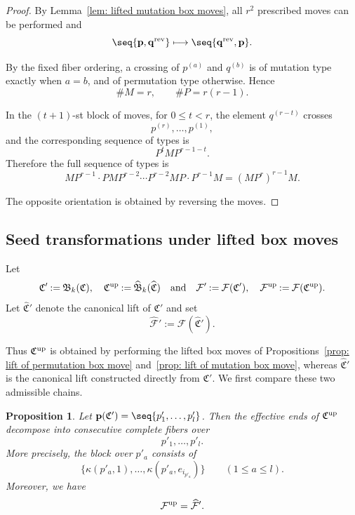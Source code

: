 \documentclass[12pt, leqno]{amsart}
\numberwithin{equation}{section}
\theoremstyle{plain}
\newtheorem{proposition}[lemma]{Proposition}
\theoremstyle{definition}
\renewcommand{\le}{\leqslant}
\newcommand{\seteq}{\mathbin{:=}}
\newcommand{\rev}{{\rm rev}}
\newcommand{\up}{{\rm up}}
\newcommand{\frakB}{\mathfrak{B}}
\newcommand{\frakC}{\mathfrak{C}}
\newcommand{\hfrakC}{\widehat{\frakC}}
\newcommand{\bfp}{\mathbf{p}}
\newcommand{\bfq}{\mathbf{q}}
\newcommand{\calF}{\mathcal{F}}
\newcommand{\hcalF}{{\widehat{\calF}}}
\newcommand{\hfrakB}{\widehat{\frakB}}
\newcommand{\qtq}[1][{and}]{\quad\text{{#1}}\quad}
\begin{document}
\begin{proof}
By Lemma~\ref{lem: lifted mutation box moves}, all $r^2$ prescribed
 moves can be performed and
\[
\seq{\bfp,\bfq^{\rev}} \longmapsto \seq{\bfq^{\rev},\bfp}.
\]

By the fixed fiber ordering, a crossing of $p^{(a)}$ and $q^{(b)}$
is of mutation type exactly when $a=b$, and of permutation type
otherwise. Hence
\[
\#M=r, \qquad  \#P=r(r-1).
\]

In the $(t+1)$-st block of moves, for $0\le t<r$, the element
$q^{(r-t)}$ crosses
\[
p^{(r)},\ldots,p^{(1)},
\]
and the corresponding sequence of types is \[
P^tMP^{r-1-t}.
\]
Therefore the full sequence of types is \[
MP^{r-1}\cdot PMP^{r-2}\cdots P^{r-2}MP\cdot P^{r-1}M = (MP^r)^{r-1}M.
\]

The opposite orientation is obtained by reversing the moves.
\end{proof}

\subsection{Seed transformations under lifted box moves}

Let
\[
\frakC'\seteq\frakB_k(\frakC), \quad \frakC^\up\seteq\hfrakB_k(\hfrakC) \qtq  \calF'\seteq\calF(\frakC'),
\quad
\calF^\up\seteq\calF(\frakC^\up).
\]
Let $\hfrakC'$ denote the canonical lift of $\frakC'$ and set
\[
\hcalF'\seteq\calF(\hfrakC').
\]

Thus $\frakC^\up$ is obtained by performing the lifted box moves of Propositions~\ref{prop: lift of permutation box move}
and~\ref{prop: lift of mutation box move}, whereas $\hfrakC'$ is the canonical lift constructed
directly from  $\frakC'$. We first compare
these two admissible chains. \par
\begin{proposition}\label{prop: lifted box move endpoint family}
Let $\bfp(\frakC')=\seq{p'_1,\ldots,p'_l}$.
Then the effective ends of $\frakC^\up$ decompose into consecutive
complete fibers over
\[
p'_1,\ldots,p'_l.
\]
More precisely, the block over $p'_a$ consists of
\[
\{\kappa(p'_a,1),\ldots,\kappa(p'_a,e_{i_{p'_a}})\} \qquad(1\le a\le l).
\]
Moreover, we have $$\calF^\up=\hcalF'.$$
\end{proposition}
\end{document}
